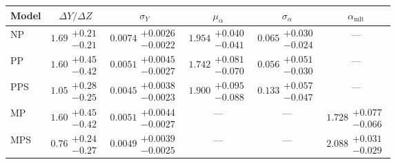 \begin{tabular}{lccccc}
\toprule
Model &              $\Delta Y/\Delta Z$ &                             $\sigma_Y$ &                        $\mu_\alpha$ &                     $\sigma_\alpha$ &               $\alpha_\mathrm{mlt}$ \\
\midrule
            NP &  $1.69\substack{+0.21 \\ -0.21}$ &  $0.0074\substack{+0.0026 \\ -0.0022}$ &  $1.954\substack{+0.040 \\ -0.041}$ &  $0.065\substack{+0.030 \\ -0.024}$ &                                 --- \\
            PP &  $1.60\substack{+0.45 \\ -0.42}$ &  $0.0051\substack{+0.0045 \\ -0.0027}$ &  $1.742\substack{+0.081 \\ -0.070}$ &  $0.056\substack{+0.051 \\ -0.030}$ &                                 --- \\
           PPS &  $1.05\substack{+0.28 \\ -0.25}$ &  $0.0045\substack{+0.0038 \\ -0.0023}$ &  $1.900\substack{+0.095 \\ -0.088}$ &  $0.133\substack{+0.057 \\ -0.047}$ &                                 --- \\
            MP &  $1.60\substack{+0.45 \\ -0.42}$ &  $0.0051\substack{+0.0044 \\ -0.0027}$ &                                 --- &                                 --- &  $1.728\substack{+0.077 \\ -0.066}$ \\
           MPS &  $0.76\substack{+0.24 \\ -0.27}$ &  $0.0049\substack{+0.0039 \\ -0.0025}$ &                                 --- &                                 --- &  $2.088\substack{+0.031 \\ -0.029}$ \\
\bottomrule
\end{tabular}
